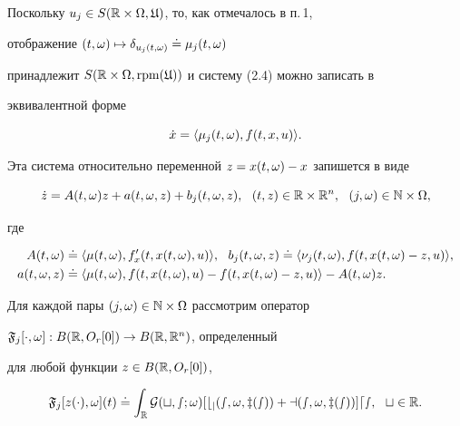 Поскольку $u_{j}\in S(\Bbb R\times\Omega,\frak U)$, то, как отмечалось в п.\,1,


отображение $(t,\omega)\mapsto \delta_{u_{j}(t,\omega)}\doteq\mu_{j}(t,\omega)$


принадлежит $S(\Bbb R\times\Omega,\operatorname{rpm}(\frak U))$ и систему (2.4) можно записать в


эквивалентной форме


\begin{equation}


\Dot x=\la\mu_{j}(t,\om),f(t,x,u)\ra.


\end{equation}


Эта система относительно переменной $z=x(t,\omega)-x$ запишется в виде


\begin{equation}


\Dot z=A(t,\om)z+a(t,\om,z)+b_{j}(t,\om,z),\ \ (t,z)\in\R\times\R^{n},


\ \ (j,\om)\in\Bbb N\times\Om,


\end{equation}


где


\begin{equation}


\begin{split}


A(t,\om)&\doteq\la\mu(t,\om), f'_{x}(t,x(t,\om),u)\ra,


\ \ b_{j}(t,\om,z)\doteq\la\nu_{j}(t,\om),f(t,x(t,\om)-z,u)\ra, \\


a(t,\om,z)&\doteq\la\mu(t,\om),f(t,x(t,\om),u) -f(t,x(t,\om)-z,u)\ra


-A(t,\om)z.


\end{split}


\end{equation}





Для каждой пары $(j,\omega)\in\Bbb N\times\Omega$ рассмотрим оператор


$\frak F_{j}[\cdot,\omega]: B(\Bbb R,O_{r}[0])\to B(\Bbb R,\Bbb R^{n})$, определенный


для любой функции $z\in B(\Bbb R,O_{r}[0])$,


\begin{equation}


\frak F_{j}[z(\cdot),\om](t)\doteq\int_{\R}


\cal G(t,s;\om)[b_{j}(s,\om,z(s))+a(s,\om,z(s))]ds, \ \ t\in\R.


\end{equation}


